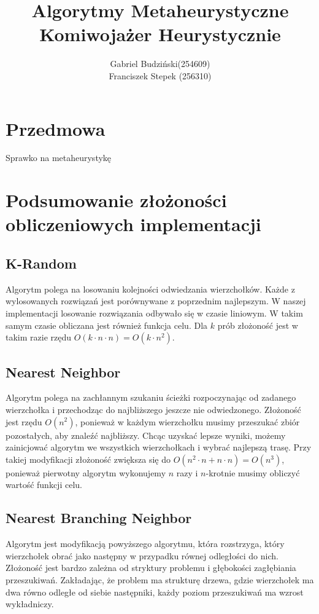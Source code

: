 \documentclass{article}
\title{\textbf{Algorytmy Metaheurystyczne\\Komiwojażer Heurystycznie}}
\author{Gabriel Budziński(254609)\\Franciszek Stepek (256310)}
\date{}
\begin{document}
 
\maketitle

\section*{Przedmowa}
Sprawko na metaheurystykę

\section{Podsumowanie złożoności obliczeniowych implementacji}
\subsection{K-Random}
Algorytm polega na losowaniu kolejności odwiedzania wierzchołków. Każde z wylosowanych rozwiązań jest porównywane z poprzednim najlepszym. W naszej implementacji losowanie rozwiązania odbywało się w czasie liniowym. W takim samym czasie obliczana jest również funkcja celu. Dla $k$ prób złożoność jest w takim razie rzędu $O(k\cdot n\cdot n) = O(k \cdot n^2)$.

\subsection{Nearest Neighbor}
Algorytm polega na zachłannym szukaniu ścieżki rozpoczynając od zadanego wierzchołka i przechodząc do najbliższego jeszcze nie odwiedzonego. Złożoność jest rzędu $O(n^2)$, ponieważ w każdym wierzchołku musimy przeszukać zbiór pozostałych, aby znaleźć najbliższy. Chcąc uzyskać lepsze wyniki, możemy zainicjować algorytm we wszystkich wierzchołkach i wybrać najlepszą trasę. Przy takiej modyfikacji złożoność zwiększa się do $O(n^2 \cdot n + n\cdot n) = O(n^3)$, ponieważ pierwotny algorytm wykonujemy $n$ razy i $n$-krotnie musimy obliczyć wartość funkcji celu.

\subsection{Nearest Branching Neighbor}
Algorytm jest modyfikacją powyższego algorytmu, która rozstrzyga, który wierzchołek obrać jako następny w przypadku równej odległości do nich. Złożoność jest bardzo zależna od stryktury problemu i głębokości zagłębiania przeszukiwań. Zakładając, że problem ma strukturę drzewa, gdzie wierzchołek ma dwa równo odległe od siebie następniki, każdy poziom przeszukiwań ma wzrost wykładniczy.
\end{document}
